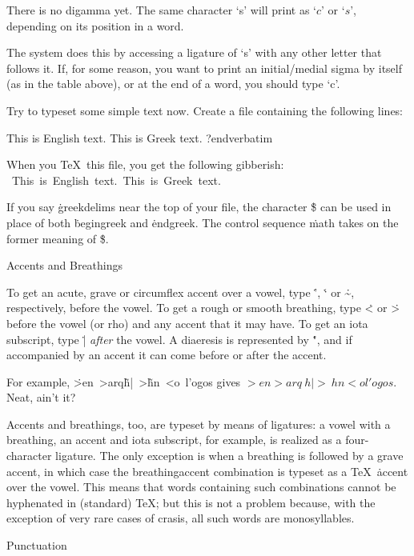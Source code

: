 There is no digamma yet.  The same character `s' will print as
`$c$' or `$s$', depending on its position in a word.

\begineight
The system does this by accessing a ligature of `s' with any other
letter that follows it.  If, for some reason, you want to print
an initial/medial sigma by itself (as in the table above), or
at the end of a word, you should type `c'.
\endeight

Try to typeset some simple text now.  Create a file
containing the following lines:

\beginverbatim
This is English text.
\begingreek
This is Greek text.
\endgreek
?endverbatim

When you \TeX\ this file, you get the following gibberish:
\display
\hbox{
This is English text.
\begingreek
This is Greek text.
\endgreek
}
\enddisplay

If you say \.{\!greekdelims} near the top of your file,
the character \.{\$} can be used
in place of both \.{\!begingreek} and \.{\!endgreek}.  The control
sequence \.{\!math} takes on the former meaning of \.{\$}.

\heading
Accents and Breathings
\endheading

To get an acute, grave or circumflex accent over a vowel,
type \.{'}, \.{`} or \.{\~}, respectively, before the vowel.
To get a rough or smooth breathing, type \.{<} or \.{>} before
the vowel (or rho) and any accent that it may have.  To get an iota
subscript, type \.{|} {\it after\/} the vowel.  A diaeresis is
represented by \.{"}, and if accompanied by an accent it can come
before or after the accent.

For example, \hbox{\.{>en >arq\~h| >\~hn <o l'ogos}}
gives \hbox{$>en >arq~h| >~hn <o l'ogos$}.
Neat, ain't it?

\begineight
Accents and breathings, too, are typeset by means of ligatures: a
vowel with a breathing, an accent and iota subscript, for example,
is realized as a four-character ligature.  The only exception is
when a breathing is followed by a grave accent, in which case the
breathing\plus accent combination is typeset as a \TeX\ \.{\!accent}
over the vowel.  This means that words containing such combinations
cannot be hyphenated in (standard) \TeX; but this is not a problem
because, with the exception of very rare cases of crasis, all such words
are monosyllables.
\endeight

\heading
Punctuation
\endheading

